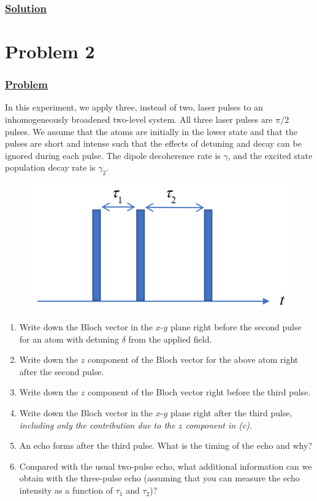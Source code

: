 \documentclass[12pt]{article}
\begin{document}
\subsubsection*{\underline{Solution}}


\section*{Problem 2}
\subsubsection*{\underline{Problem}}
In this experiment, we apply three, instead of two, laser pulses to an inhomogeneously broadened two-level system.
All three laser pulses are $\pi/2$ pulses.
We assume that the atoms are initially in the lower state and that the pulses are short and intense such that the effects of detuning and decay can be ignored during each pulse.
The dipole decoherence rate is $\gamma$, and the excited state population decay rate is $\gamma_2$.
\begin{figure}[h]
    \centering
    \includegraphics[scale=.75]{spin_echo.png}
\end{figure}
\begin{enumerate}[label=(\alph*)]
    \item Write down the Bloch vector in the $x$-$y$ plane right before the second pulse for an atom with detuning $\delta$ from the applied field.
    \item Write down the $z$ component of the Bloch vector for the above atom right after the second pulse.
    \item Write down the $z$ component of the Bloch vector right before the third pulse.
    \item Write down the Bloch vector in the $x$-$y$ plane right after the third pulse, \textit{including only the contribution due to the $z$ component in (c)}.
    \item An echo forms after the third pulse. What is the timing of the echo and why?
    \item Compared with the usual two-pulse echo, what additional information can we obtain with the three-pulse echo (assuming that you can measure the echo intensity as a function of $\tau_1$ and $\tau_2$)?
\end{enumerate}
\end{document}
